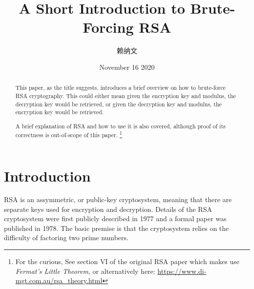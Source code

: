 \documentclass[twocolumn, a4paper,12pt]{article}
\title{A Short Introduction to Brute-Forcing RSA}
\author{\cjkfont 赖纳文}
\date{November 16 2020}
\begin{document}
\maketitle



\begin{abstract}
This paper, as the title suggests, introduces a brief overview on how to brute-force RSA cryptography.
This could either mean 
given the encryption key and modulus, the decryption key would be retrieved, 
or given the decryption key and modulus, the encryption key would be retrieved. 

A brief explanation of RSA and how to use it is also
covered, although proof of its correctness is out-of-scope of this paper.
\footnote{For the curious, See section VI of the original RSA paper\cite{Rivest1978} which
makes use {\em Fermat's Little Theorem}, or alternatively here: \href{https://www.di-mgt.com.au/rsa\_theory.html}{https://www.di-mgt.com.au/rsa\_theory.html}}
\end{abstract}

\section{Introduction}
RSA is an assymmetric, or public-key cryptosystem,
meaning that there are separate keys used for encryption and decryption.
Details of the RSA cryptosystem were first publicly described in 1977 and a formal paper was published in 1978. \cite{Rivest1978} The basic premise is that the cryptosystem relies on 
the difficulty of factoring two prime numbers. 
\end{document}
